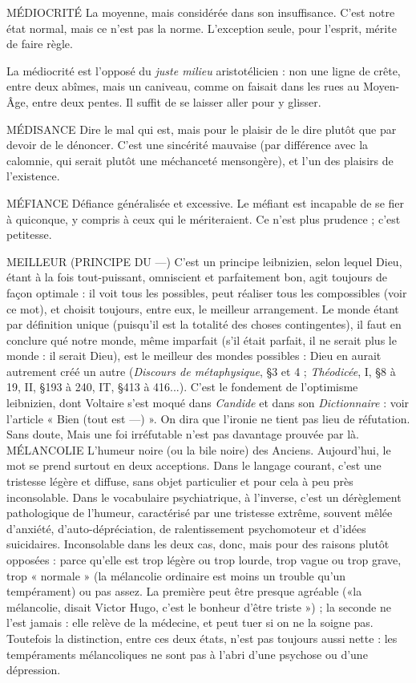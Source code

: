 MÉDIOCRITÉ La moyenne, mais considérée dans son insuffisance. C’est
notre état normal, mais ce n’est pas la norme. L’exception
seule, pour l'esprit, mérite de faire règle.

La médiocrité est l'opposé du {\it juste milieu} aristotélicien : non une ligne de
crête, entre deux abîmes, mais un caniveau, comme on faisait dans les rues au
Moyen-Âge, entre deux pentes. Il suffit de se laisser aller pour y glisser.

MÉDISANCE Dire le mal qui est, mais pour le plaisir de le dire plutôt que
par devoir de le dénoncer. C’est une sincérité mauvaise (par
différence avec la calomnie, qui serait plutôt une méchanceté mensongère), et
l'un des plaisirs de l'existence.

MÉFIANCE  Défiance généralisée et excessive. Le méfiant est incapable de se
fier à quiconque, y compris à ceux qui le mériteraient. Ce n’est
plus prudence ; c’est petitesse.

MEILLEUR (PRINCIPE DU —) C'est un principe leibnizien, selon lequel
Dieu, étant à la fois tout-puissant, omniscient et parfaitement bon,
agit toujours de façon optimale : il voit tous les possibles,
peut réaliser tous les compossibles (voir ce mot), et choisit toujours,
entre eux, le meilleur arrangement. Le monde étant par définition unique
(puisqu'il est la totalité des choses contingentes), il faut en conclure qué notre
monde, même imparfait (s’il était parfait, il ne serait plus le monde : il serait
Dieu), est le meilleur des mondes possibles : Dieu en aurait autrement créé un
autre ({\it Discours de métaphysique}, \S 3 et 4 ; {\it Théodicée}, I, \S 8 à 19, II, \S 193 à
240, IT, \S 413 à 416...). C’est le fondement de l’optimisme leibnizien, dont
Voltaire s’est moqué dans {\it Candide} et dans son {\it Dictionnaire} : voir l’article
« Bien (tout est —) ». On dira que l'ironie ne tient pas lieu de réfutation. Sans
doute, Mais une foi irréfutable n’est pas davantage prouvée par là.
MÉLANCOLIE L’humeur noire (ou la bile noire) des Anciens. Aujourd’hui,
le mot se prend surtout en deux acceptions. Dans le
langage courant, c’est une tristesse légère et diffuse, sans objet particulier et
pour cela à peu près inconsolable. Dans le vocabulaire psychiatrique, à
l'inverse, c’est un dérèglement pathologique de l'humeur, caractérisé par une
tristesse extrême, souvent mêlée d’anxiété, d’auto-dépréciation, de ralentissement
psychomoteur et d’idées suicidaires. Inconsolable dans les deux cas, donc,
mais pour des raisons plutôt opposées : parce qu’elle est trop légère ou trop
lourde, trop vague ou trop grave, trop « normale » (la mélancolie ordinaire est
moins un trouble qu’un tempérament) ou pas assez. La première peut être
presque agréable («la mélancolie, disait Victor Hugo, c’est le bonheur d’être
triste ») ; la seconde ne l’est jamais : elle relève de la médecine, et peut tuer si
on ne la soigne pas. Toutefois la distinction, entre ces deux états, n’est pas toujours
aussi nette : les tempéraments mélancoliques ne sont pas à l'abri d’une
psychose ou d’une dépression.

